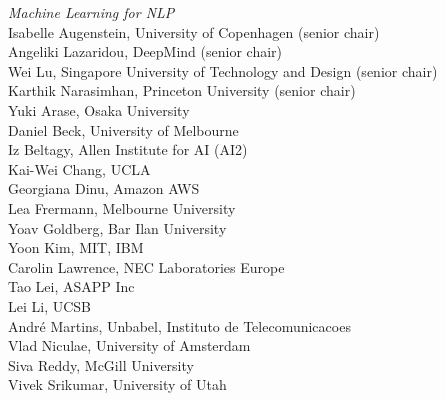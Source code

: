 \emph{Machine Learning for NLP} \\
\hspace*{0.2in} Isabelle Augenstein, University of Copenhagen (senior chair)\\
\hspace*{0.2in} Angeliki Lazaridou, DeepMind (senior chair)\\
\hspace*{0.2in} Wei Lu, Singapore University of Technology and Design (senior chair)\\
\hspace*{0.2in} Karthik Narasimhan, Princeton University (senior chair)\\
\hspace*{0.2in} Yuki Arase, Osaka University\\
\hspace*{0.2in} Daniel Beck, University of Melbourne\\
\hspace*{0.2in} Iz Beltagy, Allen Institute for AI (AI2)\\
\hspace*{0.2in} Kai-Wei Chang, UCLA\\
\hspace*{0.2in} Georgiana Dinu, Amazon AWS\\
\hspace*{0.2in} Lea Frermann, Melbourne University\\
\hspace*{0.2in} Yoav Goldberg, Bar Ilan University\\
\hspace*{0.2in} Yoon Kim, MIT, IBM\\
\hspace*{0.2in} Carolin Lawrence, NEC Laboratories Europe\\
\hspace*{0.2in} Tao Lei, ASAPP Inc\\
\hspace*{0.2in} Lei Li, UCSB\\
\hspace*{0.2in} Andr\'e Martins, Unbabel, Instituto de Telecomunicacoes\\
\hspace*{0.2in} Vlad Niculae, University of Amsterdam\\
\hspace*{0.2in} Siva Reddy, McGill University\\
\hspace*{0.2in} Vivek Srikumar, University of Utah\\
